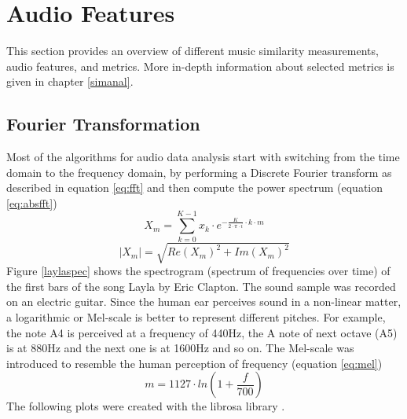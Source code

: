 \section{Audio Features}

This section provides an overview of different music similarity measurements, audio features, and metrics. More in-depth information about selected metrics is given in chapter \ref{simanal}.

\subsection{Fourier Transformation}\label{featsec}

Most of the algorithms for audio data analysis start with switching from the time domain to the frequency domain, by performing a Discrete Fourier transform as described in equation \ref{eq:fft} and then compute the power spectrum (equation \ref{eq:absfft}) 
\begin{equation} \label{eq:fft}
X_m = \sum_{k=0}^{K-1}{x_k \cdot e^ { - \frac{K}{ 2 \cdot \pi \cdot i}\cdot k\cdot m}}
\end{equation}
\begin{equation} \label{eq:absfft}
|X_m| = \sqrt{Re(X_m)^2 + Im(X_m)^2}
\end{equation}
Figure \ref{laylaspec} shows the spectrogram (spectrum of frequencies over time) of the first bars of the song Layla by Eric Clapton. The sound sample was recorded on an electric guitar. Since the human ear perceives sound in a non-linear matter, a logarithmic or Mel-scale is better to represent different pitches. For example, the note A4 is perceived at a frequency of 440Hz, the A note of next octave (A5) is at 880Hz and the next one is at 1600Hz and so on. The Mel-scale \cite[pp. 53f]{knees1} was introduced to resemble the human perception of frequency (equation \ref{eq:mel})
\begin{equation} \label{eq:mel}
m = 1127 \cdot ln(1 + \frac{f}{700})
\end{equation}
The following plots were created with the librosa library \cite{librosa1}.

